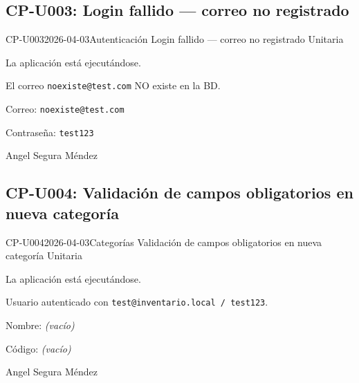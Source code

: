 \subsection{CP-U003: Login fallido --- correo no registrado}
\def\cpPasos{%
  \item Cerrar sesión.
  \item Ingresar correo: \texttt{noexiste@test.com}
  \item Ingresar contraseña: \texttt{test123}
  \item Hacer clic en ``Iniciar sesión''.}
\def\cpResultadoE{%
  \item El sistema muestra un mensaje de error.
  \item No redirige al dashboard.}
\def\cpResultadoO{El sistema mostró el mensaje: ``el usuario o contraseña son incorrectos''.
  No redirigió al dashboard.}
\casoprueba
  {CP-U003}{2026-04-03}{Autenticación}
  {Login fallido --- correo no registrado}
  {Unitaria}{\estadoAprobado}
  {\item La aplicación está ejecutándose.
   \item El correo \texttt{noexiste@test.com} NO existe en la BD.}
  {\item Correo: \texttt{noexiste@test.com}
   \item Contraseña: \texttt{test123}}
  {Angel Segura Méndez}

\subsection{CP-U004: Validación de campos obligatorios en nueva categoría}
\def\cpPasos{%
  \item Navegar a ``Categorías''.
  \item Hacer clic en ``Nueva categoría''.
  \item Dejar todos los campos vacíos.
  \item Intentar guardar.}
\def\cpResultadoE{%
  \item El formulario no se envía.
  \item Muestra indicación de campos requeridos.}
\def\cpResultadoO{El formulario mostró mensajes en los campos indicando que son requeridos.
  No se envió el formulario.}
\casoprueba
  {CP-U004}{2026-04-03}{Categorías}
  {Validación de campos obligatorios en nueva categoría}
  {Unitaria}{\estadoAprobado}
  {\item La aplicación está ejecutándose.
   \item Usuario autenticado con \texttt{test@inventario.local / test123}.}
  {\item Nombre: \textit{(vacío)}
   \item Código: \textit{(vacío)}}
  {Angel Segura Méndez}

